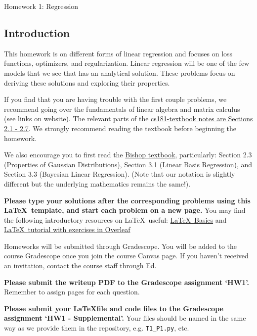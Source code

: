 \documentclass[submit]{harvardml}
\begin{document}
\begin{center}
{\Large Homework 1: Regression}\\
\end{center}

\subsection*{Introduction}
This homework is on different forms of linear regression and focuses
on loss functions, optimizers, and regularization. Linear regression
will be one of the few models that we see that has an analytical
solution.  These problems focus on deriving these solutions and
exploring their properties.

If you find that you are having trouble with the first couple
problems, we recommend going over the fundamentals of linear algebra
and matrix calculus (see links on website).  The relevant parts of the
\href{https://github.com/harvard-ml-courses/cs181-textbook/blob/master/Textbook.pdf}{cs181-textbook notes are Sections 2.1 - 2.7}.  We strongly recommend
reading the textbook before beginning the homework.

    We also encourage you to first read the \href{http://users.isr.ist.utl.pt/~wurmd/Livros/school/Bishop\%20-\%20Pattern\%20Recognition\%20And\%20Machine\%20Learning\%20-\%20Springer\%20\%202006.pdf}{Bishop textbook}, particularly:
Section 2.3 (Properties of Gaussian Distributions), Section 3.1
(Linear Basis Regression), and Section 3.3 (Bayesian Linear
Regression). (Note that our notation is slightly different but the
underlying mathematics remains the same!).

\textbf{Please type your solutions after the corresponding problems using this
\LaTeX\ template, and start each problem on a new page.} You may find
the following introductory resources on \LaTeX\ useful:
\href{http://www.mjdenny.com/workshops/LaTeX_Intro.pdf}{\LaTeX\ Basics}
and \href{https://www.overleaf.com/learn/latex/Free_online_introduction_to_LaTeX_(part_1)}{\LaTeX\ tutorial with exercises in Overleaf}

Homeworks will be submitted through Gradescope. You will be added to
the course Gradescope once you join the course Canvas page. If you
haven't received an invitation, contact the course staff through Ed.

\textbf{Please submit the writeup PDF to the Gradescope assignment
  `HW1'.} Remember to assign pages for each question.

\textbf{Please submit your \LaTeX file and code files to the
  Gradescope assignment `HW1 - Supplemental'.} Your files should be
named in the same way as we provide them in the repository,
e.g. \texttt{T1\_P1.py}, etc.
\end{document}
